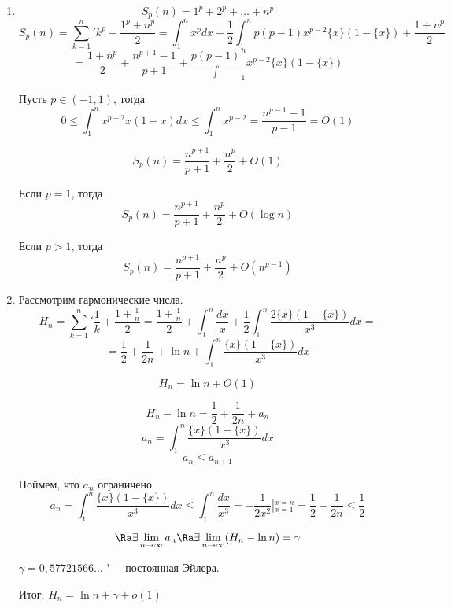 ﻿\begin{exmp}
\begin{enumerate}
\item 
$$S_p(n) = 1^p + 2^p + \ldots + n^p$$
$$S_p(n) = {\sum_{k = 1}^{n}}' k^p + \frac{1^p + n^p}{2} = 
\int_1^n x^p dx + \frac{1}{2}\int_1^n p(p - 1)x^{p - 2}\{x\}(1 - \{x\}) + \frac{1 + n^p}{2}$$
$$= \frac{1 + n^p}{2} + \frac{n^{p + 1} - 1}{p + 1} + \frac{p(p - 1)}\int_1^n x^{p - 2}\{x\}(1 - \{x\})$$

Пусть $p \in (-1, 1)$, тогда
$$0 \le \int_1^n x^{p - 2}{x}(1 - {x})dx \le \int_1^{n}x^{p - 2} = 
\frac{n^{p - 1} - 1}{p - 1} = O(1)$$

$$S_p(n) = \frac{n^{p + 1}}{p + 1} + \frac{n^p}{2} + O(1)$$


Если $p = 1$, тогда
$$S_p(n) = \frac{n^{p + 1}}{p + 1} + \frac{n^p}{2} + O(\log n)$$

Если $p > 1$, тогда
$$S_p(n) = \frac{n^{p + 1}}{p + 1} + \frac{n^p}{2} + O(n^{p - 1})$$

\item
Рассмотрим гармонические числа.
$$H_n = {\sum_{k = 1}^n}' \frac{1}{k} + \frac{1 + \frac{1}{n}}{2} =
\frac{1 + \frac{1}{n}}{2} + \int_1^{n}\frac{dx}{x} + \frac{1}{2}\int_1^n\frac{2\{x\}(1 - \{x\})}{x^3}dx =$$
$$= \frac{1}{2} + \frac{1}{2n} + \ln n + \int_1^n\frac{\{x\}(1 - \{x\})}{x^3}dx$$

$$H_n = \ln n + O(1)$$

$$H_n - \ln n = \frac{1}{2} + \frac{1}{2n} + a_n$$
$$a_n = \int_1^n\frac{\{x\}(1 - \{x\})}{x^3}dx$$
$$a_n \le a_{n + 1}$$

Поймем, что $a_n$ ограничено
$$a_n = \int_1^n\frac{\{x\}(1 - \{x\})}{x^3}dx \le 
\int_1^{n}\frac{dx}{x^3} = -\frac{1}{2x^2}\left |_{x = 1}^{x = n} \right . = 
\frac{1}{2} - \frac{1}{2n} \le \frac{1}{2}$$

$$\Ra \exists \lim_{n \to \infty} a_n \Ra \exists \lim_{n \to \infty}(H_n - \ln n) = \gamma$$ 

$\gamma = 0,57721566\ldots$ "--- постоянная Эйлера.

Итог: $H_n = \ln n + \gamma + o(1)$
\end{enumerate}                                                                           

\end{exmp}